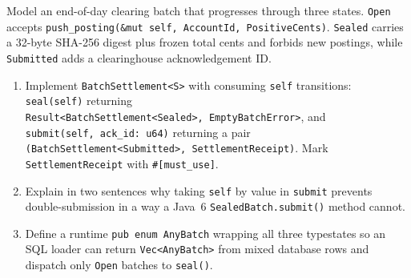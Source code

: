 \begin{exercise}
Model an end-of-day clearing batch that progresses through three states. \texttt{Open} accepts \texttt{push\_posting(\&mut self,\allowbreak\ AccountId,\allowbreak\ PositiveCents)}. \texttt{Sealed} carries a 32-byte SHA-256 digest plus frozen total cents and forbids new postings, while \texttt{Submitted} adds a clearinghouse acknowledgement ID.
\begin{enumerate}[label=(\alph*)]
  \item Implement \texttt{Batch\allowbreak{}Settlement<S>} with consuming \texttt{self} transitions: \texttt{seal(self)} returning \texttt{Result<\allowbreak{}Batch\allowbreak{}Settlement<Sealed>,\allowbreak\ Empty\allowbreak{}Batch\allowbreak{}Error>}, and \texttt{submit(self,\allowbreak\ ack\_id: u64)} returning a pair \texttt{(Batch\allowbreak{}Settlement<Submitted>,\allowbreak\ Settlement\allowbreak{}Receipt)}. Mark \texttt{Settlement\allowbreak{}Receipt} with \texttt{\#[must\_use]}.
  \item Explain in two sentences why taking \texttt{self} by value in \texttt{submit} prevents double-submission in a way a Java~6 \texttt{SealedBatch.submit()} method cannot.
  \item Define a runtime \texttt{pub enum AnyBatch} wrapping all three typestates so an SQL loader can return \texttt{Vec<AnyBatch>} from mixed database rows and dispatch only \texttt{Open} batches to \texttt{seal()}.
\end{enumerate}
\end{exercise}

